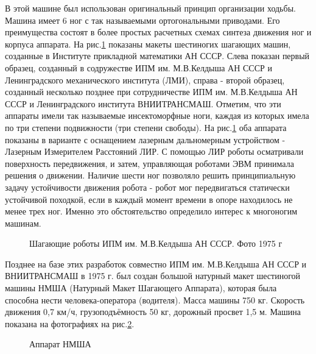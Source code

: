 В этой машине был использован оригинальный принцип организации ходьбы. Машина имеет 6 ног с так называемыми ортогональными приводами. Его преимущества состоят в более простых расчетных схемах синтеза движения ног и корпуса аппарата.
На рис.\ref{fig9} показаны макеты шестиногих шагающих машин, созданные в Институте прикладной математики АН СССР. Слева показан первый образец, созданный в содружестве ИПМ им. М.В.Келдыша АН СССР и Ленинградского механического института (ЛМИ), справа - второй образец, созданный несколько позднее при сотрудничестве ИПМ им. М.В.Келдыша АН СССР и Ленинградского института ВНИИТРАНСМАШ. 
Отметим, что эти аппараты имели так называемые инсектоморфные ноги, каждая из которых имела по три степени подвижности (три степени свободы). На рис.\ref{fig9} оба аппарата показаны в варианте с оснащением лазерным дальномерным устройством - Лазерным Измерителем Расстояний ЛИР. С помощью ЛИР роботы осматривали поверхность передвижения, и затем, управляющая роботами ЭВМ принимала решения о движении. Наличие шести ног позволяло решить принципиальную задачу устойчивости движения робота - робот мог передвигаться статически устойчивой походкой, если в каждый момент времени в опоре находилось не менее трех ног. Именно это обстоятельство определило интерес к многоногим машинам.

\begin{figure}[here]
\begin{minipage}{0.49\linewidth}
\end{minipage}
\hfill
\begin{minipage}{0.49\linewidth}
\end{minipage}
\caption{Шагающие роботы ИПМ им. М.В.Келдыша АН СССР. Фото 1975 г}
\label{fig9}
\end{figure} 

Позднее на базе этих разработок совместно ИПМ им. М.В.Келдыша АН СССР и ВНИИТРАНСМАШ в 1975 г. был создан большой натурный макет шестиногой машины НМША (Натурный Макет Шагающего Аппарата), которая была способна нести человека-оператора (водителя). Масса машины 750 кг. Скорость движения 0,7 км/ч, грузоподъёмность 50 кг, дорожный просвет 1,5 м. Машина показана на фотографиях на рис.\ref{fig10}.

\begin{figure}[h]
\begin{minipage}{0.49\linewidth}
\end{minipage}
\hfill
\begin{minipage}{0.49\linewidth}
\end{minipage}
\caption{Аппарат НМША}
\label{fig10}
\end{figure} 

